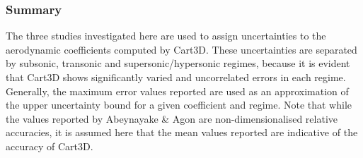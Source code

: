 \subsubsection{Summary}
The three studies investigated here are used to assign uncertainties to the aerodynamic coefficients computed by Cart3D. These uncertainties are separated by subsonic, transonic and supersonic/hypersonic regimes, because it is evident that Cart3D shows significantly varied and uncorrelated errors in each regime. Generally, the maximum error values reported are used as an approximation of the upper uncertainty bound for a given coefficient and regime. 
  Note that while the values reported by Abeynayake \& Agon\cite{Abeynayake2013a} are non-dimensionalised relative accuracies, it is assumed here that the mean values reported are indicative of the accuracy of Cart3D. 
  
